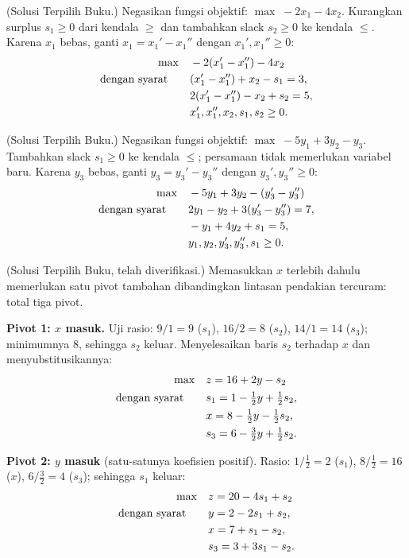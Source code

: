 (Solusi Terpilih Buku.) Negasikan fungsi objektif:
$\max\; -2x_1 - 4x_2$. Kurangkan surplus $s_1 \geq 0$ dari kendala $\geq$
dan tambahkan slack $s_2 \geq 0$ ke kendala $\leq$. Karena
$x_1$ bebas, ganti $x_1 = x_1' - x_1''$ dengan
$x_1', x_1'' \geq 0$:
\[
\begin{aligned}
\max \quad & -2(x_1' - x_1'') - 4x_2 \\
\mbox{dengan syarat}\quad \quad & (x_1' - x_1'') + x_2 - s_1 = 3, \\
& 2(x_1' - x_1'') - x_2 + s_2 = 5, \\
& x_1', x_1'', x_2, s_1, s_2 \geq 0.
\end{aligned}
\]


(Solusi Terpilih Buku.) Negasikan fungsi objektif:
$\max\; -5y_1 + 3y_2 - y_3$. Tambahkan slack $s_1 \geq 0$ ke kendala $\leq$;
persamaan tidak memerlukan variabel baru. Karena $y_3$
bebas, ganti $y_3 = y_3' - y_3''$ dengan $y_3', y_3'' \geq 0$:
\[
\begin{aligned}
\max \quad & -5y_1 + 3y_2 - (y_3' - y_3'') \\
\mbox{dengan syarat}\quad \quad & 2y_1 - y_2 + 3(y_3' - y_3'') = 7, \\
& -y_1 + 4y_2 + s_1 = 5, \\
& y_1, y_2, y_3', y_3'', s_1 \geq 0.
\end{aligned}
\]


(Solusi Terpilih Buku, telah diverifikasi.) Memasukkan $x$ terlebih dahulu memerlukan satu
pivot tambahan dibandingkan lintasan pendakian tercuram: total tiga pivot.

\textbf{Pivot 1: $x$ masuk.} Uji rasio: $9/1 = 9$ ($s_1$),
$16/2 = 8$ ($s_2$), $14/1 = 14$ ($s_3$); minimumnya $8$, sehingga $s_2$
keluar. Menyelesaikan baris $s_2$ terhadap $x$ dan menyubstitusikannya:
\[
\begin{aligned}
\max\quad & z = 16 + 2y - s_2 \\
\mbox{dengan syarat}\quad\quad & s_1 = 1 - \tfrac12 y + \tfrac12 s_2, \\
& x = 8 - \tfrac12 y - \tfrac12 s_2, \\
& s_3 = 6 - \tfrac32 y + \tfrac12 s_2.
\end{aligned}
\]

\textbf{Pivot 2: $y$ masuk} (satu-satunya koefisien positif). Rasio:
$1/\tfrac12 = 2$ ($s_1$), $8/\tfrac12 = 16$ ($x$), $6/\tfrac32 = 4$
($s_3$); sehingga $s_1$ keluar:
\[
\begin{aligned}
\max\quad & z = 20 - 4s_1 + s_2 \\
\mbox{dengan syarat}\quad\quad & y = 2 - 2s_1 + s_2, \\
& x = 7 + s_1 - s_2, \\
& s_3 = 3 + 3s_1 - s_2.
\end{aligned}
\]

